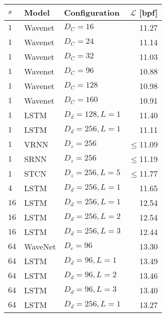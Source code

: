 \begin{table}[p]
    \centering
    \begin{tabular}{lll|r}
        \toprule
        $s$    & \bf Model           & \bf Configuration           & \bf $\mathcal{L}$ [bpf] \\
        \midrule
        $1$       & Wavenet             & $D_C=16$              & 11.27 \\
        $1$       & Wavenet             & $D_C=24$              & 11.14 \\
        $1$       & Wavenet             & $D_C=32$              & 11.03 \\
        $1$       & Wavenet             & $D_C=96$              & 10.88 \\
        $1$       & Wavenet             & $D_C=128$             & 10.98 \\
        $1$       & Wavenet             & $D_C=160$             & 10.91 \\
        $1$       & LSTM                & $D_d=128, L=1$        & 11.40 \\
        $1$       & LSTM                & $D_d=256, L=1$        & 11.11 \\
        $1$       & VRNN                & $D_z=256$             & $\leq$11.09 \\
        $1$       & SRNN                & $D_z=256$             & $\leq$11.19 \\
        1 & STCN                & $D_z=256,L=5$               & $\leq$11.77 \\  %
        \midrule
        $4$       & LSTM                & $D_d=256, L=1$        & 11.65 \\
        \midrule
        $16$      & LSTM                & $D_d=256, L=1$        & 12.54 \\
        $16$      & LSTM                & $D_d=256, L=2$        & 12.54 \\
        $16$      & LSTM                & $D_d=256, L=3$        & 12.44 \\
        \midrule
        $64$      & WaveNet             & $D_c=96$              & 13.30 \\
        $64$      & LSTM                & $D_d=96, L=1$         & 13.49 \\
        $64$      & LSTM                & $D_d=96, L=2$         & 13.46 \\
        $64$      & LSTM                & $D_d=96, L=3$         & 13.40 \\
        $64$      & LSTM                & $D_d=256, L=1$        & 13.27 \\

\end{tabular}
\end{table}
